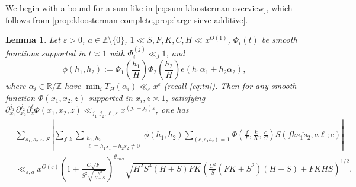 \documentclass[reqno,11pt]{amsart}
\newtheorem{lemma}[theorem]{Lemma}
\theoremstyle{remark}
\numberwithin{equation}{section}
\newcommand{\Z}{\mathbb{Z}}
\newcommand{\R}{\mathbb{R}}
\newcommand{\eps}{\varepsilon}
\renewcommand{\bar}{\overline}
\begin{document}
We begin with a bound for a sum like in \cref{eq:sum-kloosterman-overview}, which follows from \cref{prop:kloosterman-complete,prop:large-sieve-additive}.

\begin{lemma} \label{lem:consequence-Kloosterman}
Let $\eps > 0$, $a \in \Z \setminus \{0\}$, $1 \ll S, F, K, C, H \ll x^{O(1)}$, $\Phi_i(t)$ be smooth functions supported in $t \asymp 1$ with $\Phi_i^{(j)} \ll_j 1$, and  
\[
    \phi(h_1, h_2) := \Phi_1\left(\frac{h_1}{H}\right) \Phi_2\left(\frac{h_2}{H}\right) e(h_1\alpha_1 + h_2\alpha_2),
\]
where $\alpha_i \in \R/\Z$ have $\min_i T_H(\alpha_i) \ll_\eps x^\eps$ (recall \cref{eq:tn}). Then for any smooth function $\Phi(x_1, x_2, z)$ supported in $x_i, z \asymp 1$, satisfying $\partial_{x_1}^{j_1} \partial_{x_2}^{j_2} \partial_z^\ell \Phi(x_1, x_2, z) \ll_{j_1, j_2, \ell, \eps} x^{(j_1+j_2) \eps}$, one has
\[
\begin{aligned}
    &\sum_{s_1, s_2 \sim S} \left\vert
    \sum_{f,k}
    \sum_{\substack{h_1, h_2 \\ \ell = h_1 s_1 - h_2 s_2 \neq 0}} \phi(h_1, h_2)
    \sum_{(c, s_1s_2) = 1}
    \Phi\left(\frac{f}{F}, \frac{k}{K}, \frac{c}{C}\right)
    S(fk\bar{s_1 s_2}, a\ell; c)
    \right\vert
    \\
    &\ll_{\eps,a} x^{O(\eps)}
    \left(1 + \frac{C\sqrt{F}}{S^2\sqrt{\frac{H^2}{H+S}}}\right)^{\theta_{\max}} 
    \sqrt{H^2S^3 (H + S) F K}
    \left(\frac{C^2}{S}\left(FK + S^2\right)\left(H + S\right) + FKHS\right)^{1/2}.
\end{aligned}
\]
\end{lemma}
\end{document}
